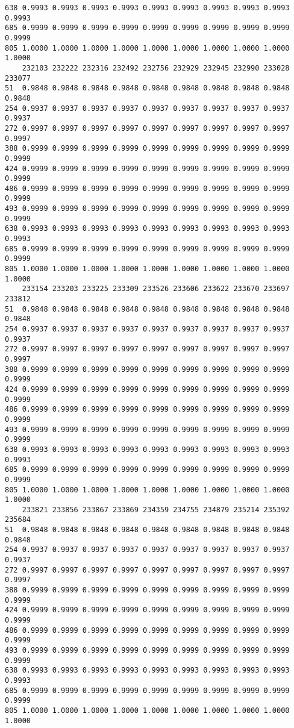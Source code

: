 \documentclass[
]{report}
\begin{document}
\begin{verbatim}
638 0.9993 0.9993 0.9993 0.9993 0.9993 0.9993 0.9993 0.9993 0.9993 0.9993
685 0.9999 0.9999 0.9999 0.9999 0.9999 0.9999 0.9999 0.9999 0.9999 0.9999
805 1.0000 1.0000 1.0000 1.0000 1.0000 1.0000 1.0000 1.0000 1.0000 1.0000
    232103 232222 232316 232492 232756 232929 232945 232990 233028 233077
51  0.9848 0.9848 0.9848 0.9848 0.9848 0.9848 0.9848 0.9848 0.9848 0.9848
254 0.9937 0.9937 0.9937 0.9937 0.9937 0.9937 0.9937 0.9937 0.9937 0.9937
272 0.9997 0.9997 0.9997 0.9997 0.9997 0.9997 0.9997 0.9997 0.9997 0.9997
388 0.9999 0.9999 0.9999 0.9999 0.9999 0.9999 0.9999 0.9999 0.9999 0.9999
424 0.9999 0.9999 0.9999 0.9999 0.9999 0.9999 0.9999 0.9999 0.9999 0.9999
486 0.9999 0.9999 0.9999 0.9999 0.9999 0.9999 0.9999 0.9999 0.9999 0.9999
493 0.9999 0.9999 0.9999 0.9999 0.9999 0.9999 0.9999 0.9999 0.9999 0.9999
638 0.9993 0.9993 0.9993 0.9993 0.9993 0.9993 0.9993 0.9993 0.9993 0.9993
685 0.9999 0.9999 0.9999 0.9999 0.9999 0.9999 0.9999 0.9999 0.9999 0.9999
805 1.0000 1.0000 1.0000 1.0000 1.0000 1.0000 1.0000 1.0000 1.0000 1.0000
    233154 233203 233225 233309 233526 233606 233622 233670 233697 233812
51  0.9848 0.9848 0.9848 0.9848 0.9848 0.9848 0.9848 0.9848 0.9848 0.9848
254 0.9937 0.9937 0.9937 0.9937 0.9937 0.9937 0.9937 0.9937 0.9937 0.9937
272 0.9997 0.9997 0.9997 0.9997 0.9997 0.9997 0.9997 0.9997 0.9997 0.9997
388 0.9999 0.9999 0.9999 0.9999 0.9999 0.9999 0.9999 0.9999 0.9999 0.9999
424 0.9999 0.9999 0.9999 0.9999 0.9999 0.9999 0.9999 0.9999 0.9999 0.9999
486 0.9999 0.9999 0.9999 0.9999 0.9999 0.9999 0.9999 0.9999 0.9999 0.9999
493 0.9999 0.9999 0.9999 0.9999 0.9999 0.9999 0.9999 0.9999 0.9999 0.9999
638 0.9993 0.9993 0.9993 0.9993 0.9993 0.9993 0.9993 0.9993 0.9993 0.9993
685 0.9999 0.9999 0.9999 0.9999 0.9999 0.9999 0.9999 0.9999 0.9999 0.9999
805 1.0000 1.0000 1.0000 1.0000 1.0000 1.0000 1.0000 1.0000 1.0000 1.0000
    233821 233856 233867 233869 234359 234755 234879 235214 235392 235684
51  0.9848 0.9848 0.9848 0.9848 0.9848 0.9848 0.9848 0.9848 0.9848 0.9848
254 0.9937 0.9937 0.9937 0.9937 0.9937 0.9937 0.9937 0.9937 0.9937 0.9937
272 0.9997 0.9997 0.9997 0.9997 0.9997 0.9997 0.9997 0.9997 0.9997 0.9997
388 0.9999 0.9999 0.9999 0.9999 0.9999 0.9999 0.9999 0.9999 0.9999 0.9999
424 0.9999 0.9999 0.9999 0.9999 0.9999 0.9999 0.9999 0.9999 0.9999 0.9999
486 0.9999 0.9999 0.9999 0.9999 0.9999 0.9999 0.9999 0.9999 0.9999 0.9999
493 0.9999 0.9999 0.9999 0.9999 0.9999 0.9999 0.9999 0.9999 0.9999 0.9999
638 0.9993 0.9993 0.9993 0.9993 0.9993 0.9993 0.9993 0.9993 0.9993 0.9993
685 0.9999 0.9999 0.9999 0.9999 0.9999 0.9999 0.9999 0.9999 0.9999 0.9999
805 1.0000 1.0000 1.0000 1.0000 1.0000 1.0000 1.0000 1.0000 1.0000 1.0000

\end{verbatim}
\end{document}
